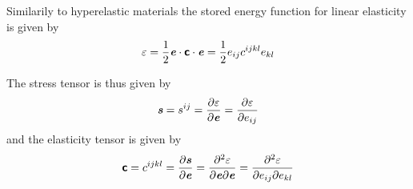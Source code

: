 Similarily to hyperelastic materials the stored energy function for linear
elasticity is given by
\begin{equation}
  \varepsilon=\frac{1}{2} \boldsymbol{\mathit{e}}  \cdot  \boldsymbol{\mathsf{c}}  \cdot  \boldsymbol{\mathit{e}} =\frac{1}{2}e_{ij}c^{ijkl}e_{kl}
\end{equation}

The stress tensor is thus given by
\begin{equation}
  \boldsymbol{\mathit{s}}=s^{ij}= \dfrac{\partial \varepsilon}{\partial \boldsymbol{\mathit{e}}} = \dfrac{\partial \varepsilon}{\partial e_{ij}} 
\end{equation}
and the elasticity tensor is given by
\begin{equation}
  \boldsymbol{\mathsf{c}}=c^{ijkl}= \dfrac{\partial \boldsymbol{\mathit{s}}}{\partial \boldsymbol{\mathit{e}}} = \dfrac{\partial^{2} \varepsilon}{\partial \boldsymbol{\mathit{e}} \partial \boldsymbol{\mathit{e}}} = \dfrac{\partial^{2} \varepsilon}{\partial e_{ij} \partial e_{kl}} 
\end{equation}
